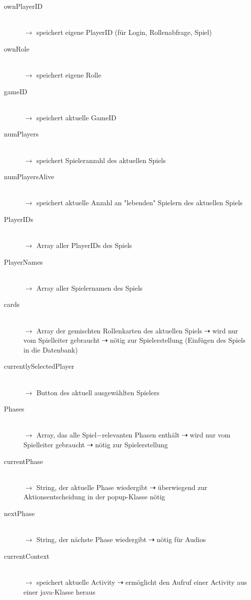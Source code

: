 \documentclass[12pt]{article}
\begin{document}
\begin{description}

\item[ownPlayerID]\hfill \\ $\rightarrow$ speichert eigene PlayerID (für Login, Rollenabfrage, Spiel)
\item[ownRole]\hfill \\ $\rightarrow$ speichert eigene Rolle
\item[gameID]\hfill \\ $\rightarrow$ speichert aktuelle GameID
\item[numPlayers]\hfill \\ $\rightarrow$ speichert Spieleranzahl des aktuellen Spiels
\item[numPlayersAlive]\hfill \\ $\rightarrow$ speichert aktuelle Anzahl an "lebenden" Spielern des aktuellen Spiels
\item[PlayerIDs]\hfill \\ $\rightarrow$ Array aller PlayerIDs des Spiels
\item[PlayerNames]\hfill \\ $\rightarrow$ Array aller Spielernamen des Spiels
\item[cards]\hfill \\ $\rightarrow$ Array der gemischten Rollenkarten des aktuellen Spiels $\dashrightarrow$ wird nur vom Spielleiter gebraucht $\dashrightarrow$ nötig zur Spielerstellung (Einfügen des Spiels in die Datenbank)
\item[currentlySelectedPlayer]\hfill \\ $\rightarrow$ Button des aktuell ausgewählten Spielers
\item[Phases]\hfill \\ $\rightarrow$ Array, das alle Spiel$-$relevanten Phasen enthält $\dashrightarrow$ wird nur vom Spielleiter gebraucht $\dashrightarrow$ nötig zur Spielerstellung
\item[currentPhase]\hfill \\ $\rightarrow$ String, der aktuelle Phase wiedergibt $\dashrightarrow$ überwiegend zur Aktionsentscheidung in der popup-Klasse nötig
\item[nextPhase]\hfill \\ $\rightarrow$ String, der nächste Phase wiedergibt $\dashrightarrow$ nötig für Audios
\item[currentContext]\hfill \\ $\rightarrow$ speichert aktuelle Activity $\dashrightarrow$ ermöglicht den Aufruf einer Activity aus einer java-Klasse heraus

\end{description}
\end{document}
